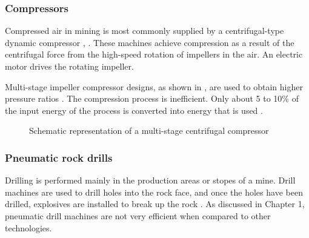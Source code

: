 \subsubsection{Compressors}
Compressed air in mining is most commonly supplied by a centrifugal-type dynamic compressor \cite{Fouche2016Masters}, \cite{Booysen2012Masters}. These machines achieve compression as a result of the centrifugal force from the high-speed rotation of impellers in the air. An electric motor drives the rotating impeller.
\par 
 Multi-stage impeller compressor designs, as shown in , are used to obtain higher  pressure ratios \cite{Fouche2016Masters}. The compression process is inefficient. Only about 5 to 10\% of the input energy of the process is converted into energy that is used \cite{yang2009air}. 
 \clearpage
\begin{figure}[!htbp]
	\centering
	\fbox{\hspace{3cm}\hspace{2.2cm}}
	\caption[Schematic representation of a multi-stage centrifugal compressor]{Schematic representation of a multi-stage centrifugal compressor\protect \footnotemark[1]}
	\label{fig: Compressor diagram}
\end{figure}

\subsubsection{Pneumatic rock drills}
Drilling is performed mainly in the production areas or stopes of a mine. Drill machines are used to drill holes into the rock face, and once the holes have been drilled, explosives are installed to break up the rock \cite{van2008development}. As discussed in Chapter 1, pneumatic drill machines are not very efficient when compared to other technologies.

